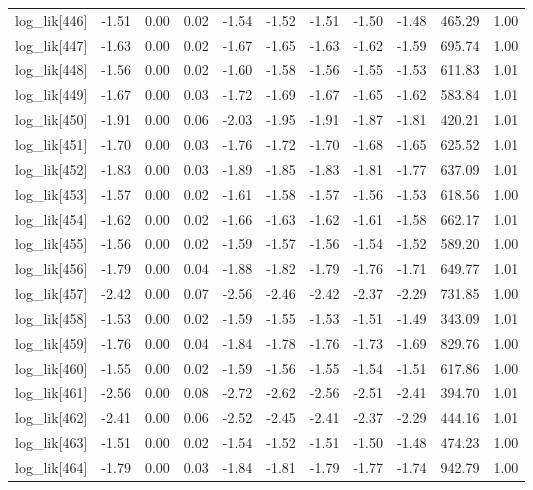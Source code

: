 \begin{table}[ht]
\begin{tabular}{rrrrrrrrrrr}
  log\_lik[446] & -1.51 & 0.00 & 0.02 & -1.54 & -1.52 & -1.51 & -1.50 & -1.48 & 465.29 & 1.00 \\ 
  log\_lik[447] & -1.63 & 0.00 & 0.02 & -1.67 & -1.65 & -1.63 & -1.62 & -1.59 & 695.74 & 1.00 \\ 
  log\_lik[448] & -1.56 & 0.00 & 0.02 & -1.60 & -1.58 & -1.56 & -1.55 & -1.53 & 611.83 & 1.01 \\ 
  log\_lik[449] & -1.67 & 0.00 & 0.03 & -1.72 & -1.69 & -1.67 & -1.65 & -1.62 & 583.84 & 1.01 \\ 
  log\_lik[450] & -1.91 & 0.00 & 0.06 & -2.03 & -1.95 & -1.91 & -1.87 & -1.81 & 420.21 & 1.01 \\ 
  log\_lik[451] & -1.70 & 0.00 & 0.03 & -1.76 & -1.72 & -1.70 & -1.68 & -1.65 & 625.52 & 1.01 \\ 
  log\_lik[452] & -1.83 & 0.00 & 0.03 & -1.89 & -1.85 & -1.83 & -1.81 & -1.77 & 637.09 & 1.01 \\ 
  log\_lik[453] & -1.57 & 0.00 & 0.02 & -1.61 & -1.58 & -1.57 & -1.56 & -1.53 & 618.56 & 1.00 \\ 
  log\_lik[454] & -1.62 & 0.00 & 0.02 & -1.66 & -1.63 & -1.62 & -1.61 & -1.58 & 662.17 & 1.01 \\ 
  log\_lik[455] & -1.56 & 0.00 & 0.02 & -1.59 & -1.57 & -1.56 & -1.54 & -1.52 & 589.20 & 1.00 \\ 
  log\_lik[456] & -1.79 & 0.00 & 0.04 & -1.88 & -1.82 & -1.79 & -1.76 & -1.71 & 649.77 & 1.01 \\ 
  log\_lik[457] & -2.42 & 0.00 & 0.07 & -2.56 & -2.46 & -2.42 & -2.37 & -2.29 & 731.85 & 1.00 \\ 
  log\_lik[458] & -1.53 & 0.00 & 0.02 & -1.59 & -1.55 & -1.53 & -1.51 & -1.49 & 343.09 & 1.01 \\ 
  log\_lik[459] & -1.76 & 0.00 & 0.04 & -1.84 & -1.78 & -1.76 & -1.73 & -1.69 & 829.76 & 1.00 \\ 
  log\_lik[460] & -1.55 & 0.00 & 0.02 & -1.59 & -1.56 & -1.55 & -1.54 & -1.51 & 617.86 & 1.00 \\ 
  log\_lik[461] & -2.56 & 0.00 & 0.08 & -2.72 & -2.62 & -2.56 & -2.51 & -2.41 & 394.70 & 1.01 \\ 
  log\_lik[462] & -2.41 & 0.00 & 0.06 & -2.52 & -2.45 & -2.41 & -2.37 & -2.29 & 444.16 & 1.01 \\ 
  log\_lik[463] & -1.51 & 0.00 & 0.02 & -1.54 & -1.52 & -1.51 & -1.50 & -1.48 & 474.23 & 1.00 \\ 
  log\_lik[464] & -1.79 & 0.00 & 0.03 & -1.84 & -1.81 & -1.79 & -1.77 & -1.74 & 942.79 & 1.00 \\ 

\end{tabular}
\end{table}
